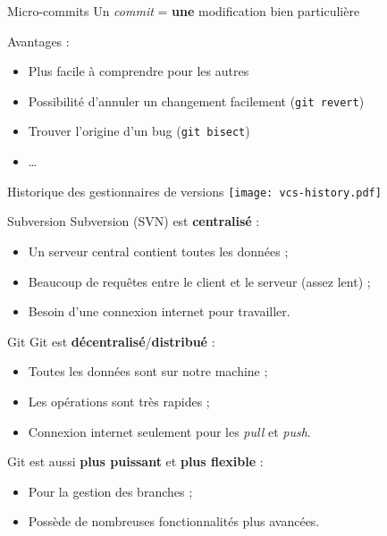 \begin{frame}{Micro-commits}
  Un \textit{commit} = \textbf{une} modification bien particulière

  \bigskip
  Avantages :
  \begin{itemize}
    \item Plus facile à comprendre pour les autres
    \item Possibilité d'annuler un changement facilement (\texttt{git revert})
    \item Trouver l'origine d'un bug (\texttt{git bisect})
    \item …
  \end{itemize}
\end{frame}


\begin{frame}{Historique des gestionnaires de versions}
\texttt{[image: vcs-history.pdf]}
\end{frame}

\begin{frame}{Subversion}
  Subversion (SVN) est \textbf{centralisé} :
  \begin{itemize}
    \item Un serveur central contient toutes les données ;
    \item Beaucoup de requêtes entre le client et le serveur (assez lent) ;
    \item Besoin d'une connexion internet pour travailler.
  \end{itemize}
\end{frame}

\begin{frame}{Git}
  Git est \textbf{décentralisé}/\textbf{distribué} :
  \begin{itemize}
    \item Toutes les données sont sur notre machine ;
    \item Les opérations sont très rapides ;
    \item Connexion internet seulement pour les \textit{pull} et \textit{push}.
  \end{itemize}

  \pause
  \bigskip
  Git est aussi \textbf{plus puissant} et \textbf{plus flexible} :
  \begin{itemize}
    \item Pour la gestion des branches ;
    \item Possède de nombreuses fonctionnalités plus avancées.
  \end{itemize}
\end{frame}

